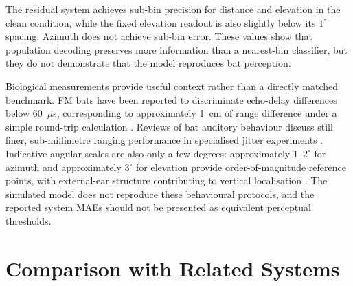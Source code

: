 \begin{table}[H]
    \centering
    \caption{Population resolution and clean-condition readout error. Residual-SNN values are system-level results after fusion and should not be interpreted as the acuity of one pathway alone.}
    \label{tab:population_resolution}
    \small
\end{table}

The residual system achieves sub-bin precision for distance and elevation in the clean condition, while the fixed elevation readout is also slightly below its $1^\circ$ spacing. Azimuth does not achieve sub-bin error. These values show that population decoding preserves more information than a nearest-bin classifier, but they do not demonstrate that the model reproduces bat perception.

Biological measurements provide useful context rather than a directly matched benchmark. FM bats have been reported to discriminate echo-delay differences below 60~$\mu$s, corresponding to approximately 1~cm of range difference under a simple round-trip calculation \cite{Simmons1973TheBats}. Reviews of bat auditory behaviour discuss still finer, sub-millimetre ranging performance in specialised jitter experiments \cite{Ulanovsky2008WhatBrain}. Indicative angular scales are also only a few degrees: approximately $1$--$2^\circ$ for azimuth and approximately $3^\circ$ for elevation provide order-of-magnitude reference points, with external-ear structure contributing to vertical localisation \cite{Ulanovsky2008WhatBrain,Lawrence1982EcholocationTargets}. The simulated model does not reproduce these behavioural protocols, and the reported system MAEs should not be presented as equivalent perceptual thresholds.

\section{Comparison with Related Systems}

